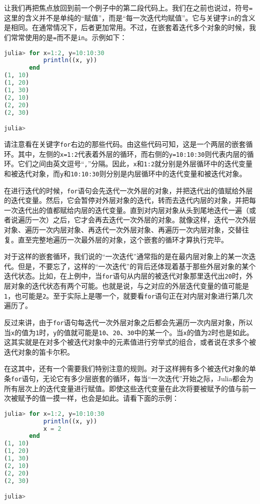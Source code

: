 让我们再把焦点放回到前一个例子中的第二段代码上。我们在之前也说过，符号\verb`=`这里的含义并不是单纯的“赋值”，而是“每一次迭代均赋值”。它与关键字\verb`in`的含义是相同。在通常情况下，后者更加常用。不过，在嵌套着迭代多个对象的时候，我们常常使用的是\verb`=`而不是\verb`in`。示例如下：
\begin{lstlisting}[language=julia]
julia> for x=1:2, y=10:10:30
           println((x, y))
       end
(1, 10)
(1, 20)
(1, 30)
(2, 10)
(2, 20)
(2, 30)

julia>
\end{lstlisting}

请注意看在关键字\verb`for`右边的那些代码。由这些代码可知，这是一个两层的嵌套循环。其中，左侧的\verb`x=1:2`代表着外层的循环，而右侧的\verb`y=10:10:30`则代表内层的循环。它们之间由英文逗号“\verb`,`”分隔。因此，\verb`x`和\verb`1:2`就分别是外层循环中的迭代变量和被迭代对象，而\verb`y`和\verb`10:10:30`则分别是内层循环中的迭代变量和被迭代对象。

在进行迭代的时候，\verb`for`语句会先迭代一次外层的对象，并把迭代出的值赋给外层的迭代变量。然后，它会暂停对外层对象的迭代，转而去迭代内层的对象，并把每一次迭代出的值都赋给内层的迭代变量。直到对内层对象从头到尾地迭代一遍（或者说遍历一次）之后，它才会再去迭代一次外层的对象。就像这样，迭代一次外层对象、遍历一次内层对象、再迭代一次外层对象、再遍历一次内层对象，交替往复。直至完整地遍历一次最外层的对象，这个嵌套的循环才算执行完毕。

对于这样的嵌套循环，我们说的“一次迭代”通常指的是在最内层对象上的某一次迭代。但是，不要忘了，这样的“一次迭代”的背后还体现着基于那些外层对象的某个迭代状态。比如，在上例中，当\verb`for`语句从内层的被迭代对象那里迭代出\verb`20`时，外层对象的迭代状态有两个可能。也就是说，与之对应的外层迭代变量的值可能是\verb`1`，也可能是\verb`2`。至于实际上是哪一个，就要看\verb`for`语句正在对内层对象进行第几次遍历了。

反过来讲，由于\verb`for`语句每迭代一次外层对象之后都会先遍历一次内层对象，所以当\verb`x`的值为\verb`1`时，\verb`y`的值就可能是\verb`10`、\verb`20`、\verb`30`中的某一个。当\verb`x`的值为\verb`2`时也是如此。这其实就是在对多个被迭代对象中的元素值进行穷举式的组合，或者说在求多个被迭代对象的笛卡尔积。

在这其中，还有一个需要我们特别注意的规则。对于这样拥有多个被迭代对象的单条\verb`for`语句，无论它有多少层嵌套的循环，每当“一次迭代”开始之际，Julia都会为所有层次上的迭代变量进行赋值。即使这些迭代变量在此次将要被赋予的值与前一次被赋予的值一摸一样，也会是如此。请看下面的示例：
\begin{lstlisting}[language=julia]
julia> for x=1:2, y=10:10:30
           println((x, y))
           x = 2
       end
(1, 10)
(1, 20)
(1, 30)
(2, 10)
(2, 20)
(2, 30)

julia> 
\end{lstlisting}

